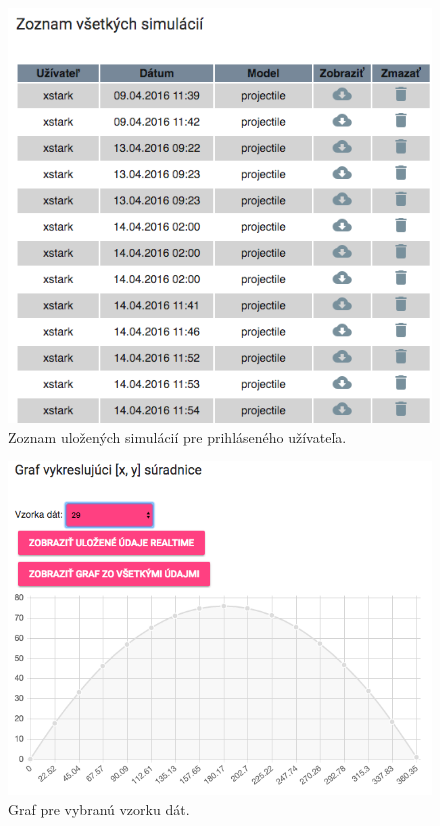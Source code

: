 \begin{figure}[H]
  \centering
  \includegraphics[scale=0.5]{img/code/angular-results-projectile.png}
  \caption{Zoznam uložených simulácií pre prihláseného užívateľa.}
  \label{img-angular-results-projectile}
\end{figure}

\begin{figure}[H]
  \centering
  \includegraphics[scale=0.5]{img/code/angular-fulldata-graph.png}
  \caption{Graf pre vybranú vzorku dát.}
  \label{img-angular-fulldata-graph}
\end{figure}

